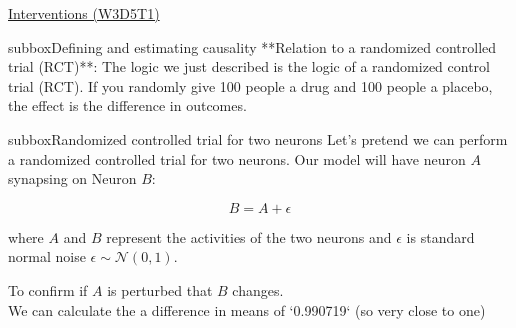 \begin{textbox}{\href{https://compneuro.neuromatch.io/tutorials/W3D5_NetworkCausality/student/W3D5_Tutorial1.html}{Interventions (W3D5T1)}   }
\begin{subbox}{subbox}{Defining and estimating causality}
**Relation to a randomized controlled trial (RCT)**:
The logic we just described is the logic of a randomized control trial (RCT). If you randomly give 100 people a drug and 100 people a placebo, the effect is the difference in outcomes.

\end{subbox}
\begin{subbox}{subbox}{Randomized controlled trial for two neurons}
\scriptsize
Let's pretend we can perform a randomized controlled trial for two neurons. Our model will have neuron $A$ synapsing on Neuron $B$:

\begin{equation*}
B = A + \epsilon
\end{equation*}

where $A$ and $B$ represent the activities of the two neurons and $\epsilon$ is standard normal noise $\epsilon\sim\mathcal{N}(0,1)$.

To confirm if  $A$ is perturbed that $B$ changes.\\
We can calculate the a difference in means of `0.990719` (so very close to one)

\end{subbox}
\end{textbox}
